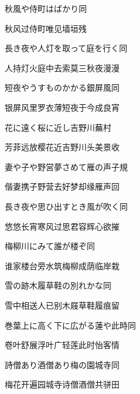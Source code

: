 \begin{haiku}
    {\FH 秋風や侍町はばかり}\hfill{\FH 同}

    {\FK 秋风过侍町唯见墙垣残}
\end{haiku}

\begin{haiku}
    {\FH 長き夜や人灯を取って庭を行く}\hfill{\FH 同}

    {\FK 人持灯火庭中去索莫三秋夜漫漫}
\end{haiku}

\begin{haiku}
    {\FH 短夜やうすものかかる銀屏風}\hfill{\FH 同}

    {\FK 银屏风里罗衣薄短夜于今成良宵}
\end{haiku}

\begin{haiku}
    {\FH 花に遠く桜に近し吉野川}\hfill{\FH 蕪村}

    {\FK 芳菲远放樱花近吉野川头美景收}
\end{haiku}

\begin{haiku}
    {\FH 妻や子や野営夢さめて雁の声}\hfill{\FH 子規}

    {\FK 偕妻携子野营去好梦却缘雁声回}
\end{haiku}

\begin{haiku}
    {\FH 長き夜や思ひ出すとき風が吹く}\hfill{\FH 同}

    {\FK 悠悠长宵寒风过思君容辉心欲摧}
\end{haiku}

\begin{haiku}
    {\FH 梅柳川にみて誰が楼ぞ}\hfill{\FH 同}

    {\FK 谁家楼台旁水筑梅柳成荫临岸栽}
\end{haiku}

\begin{haiku}
    {\FH 雪の跡木履草鞋の別れかな}\hfill{\FH 同}

    {\FK 雪中相送人已别木屐草鞋履痕留}
\end{haiku}

\begin{haiku}
    {\FH 巻葉上に高く下に広がる蓮や此時}\hfill{\FH 同}

    {\FK 卷叶舒展浮叶广轻莲此时怡客情}
\end{haiku}

\begin{haiku}
    {\FH 詩僧あり酒僧あり梅の園城寺}\hfill{\FH 同}

    {\FK 梅花开遍园城寺诗僧酒僧共骈田}
\end{haiku}

